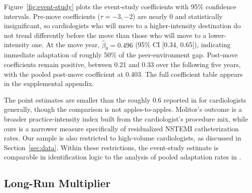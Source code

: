 \documentclass[12pt]{article}
\let\textcite\citet
\begin{document}
Figure~\ref{fig:event-study} plots the event-study coefficients with 95\% confidence intervals. Pre-move coefficients ($\tau = -3, -2$) are nearly 0 and statistically insignificant, so cardiologists who will move to a higher-intensity destination do not trend differently before the move than those who will move to a lower-intensity one. At the move year, $\hat\beta_0 = 0.496$ (95\% CI [0.34, 0.65]), indicating immediate adaptation of roughly 50\% of the peer-environment gap. Post-move coefficients remain positive, between 0.21 and 0.33 over the following five years, with the pooled post-move coefficient at 0.403. The full coefficient table appears in the supplemental appendix.

The point estimates are smaller than the roughly 0.6 reported in \textcite{molitor2018} for cardiologists generally, though the comparison is not apples-to-apples. Molitor's outcome is a broader practice-intensity index built from the cardiologist's procedure mix, while ours is a narrower measure specifically of residualized NSTEMI catheterization rates. Our sample is also restricted to high-volume cardiologists, as discussed in Section~\ref{sec:data}. Within these restrictions, the event-study estimate is comparable in identification logic to the analysis of pooled adaptation rates in \textcite{molitor2018}.

\subsection{Long-Run Multiplier}\label{sec:policy}
\end{document}
